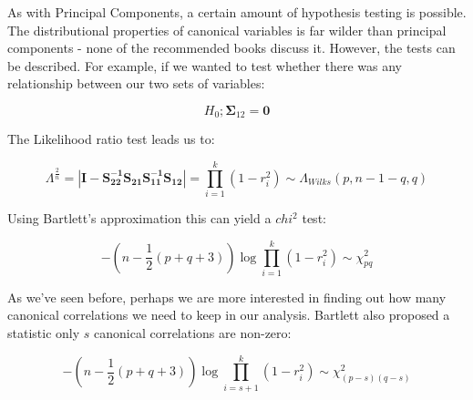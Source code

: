 As with Principal Components, a certain amount of hypothesis testing is possible.   The distributional properties of canonical variables is far wilder than principal components - none of the recommended books discuss it.   However, the tests can be described.   For example, if we wanted to test whether there was any relationship between our two sets of variables:

\begin{displaymath}
H_{0}; \boldsymbol{\Sigma}_{12} = \boldsymbol{0}
\end{displaymath}

The Likelihood ratio test leads us to:

\begin{displaymath}
\Lambda^{\frac{2}{n}} = |\boldsymbol{I} - \boldsymbol{S_{22}^{-1}}\boldsymbol{S_{21}}\boldsymbol{S_{11}^{-1}}\boldsymbol{S_{12}}| = \prod_{i=1}^{k}(1-r_{i}^{2}) \sim \Lambda_{Wilks}(p, n-1-q,q)
\end{displaymath}

Using Bartlett's approximation this can yield a $chi^{2}$ test:

\begin{displaymath}
-\left(n-\frac{1}{2}(p+q+3)\right) \log \prod_{i=1}^{k}(1-r_{i}^{2}) \sim \chi^{2}_{pq}
\end{displaymath}


As we've seen before, perhaps we are more interested in finding out how many canonical correlations we need to keep in our analysis.   Bartlett also proposed a statistic only $s$ canonical correlations are non-zero:

\begin{displaymath}
-\left(n-\frac{1}{2}(p+q+3)\right) \log \prod_{i=s+1}^{k}(1-r_{i}^{2}) \sim \chi^{2}_{(p-s)(q-s)}
\end{displaymath}

